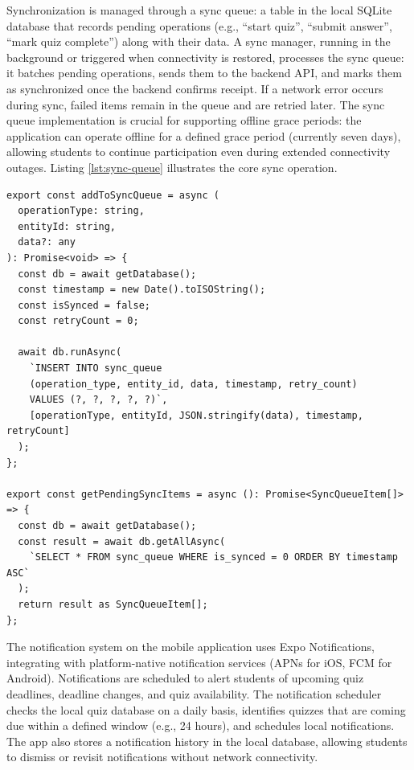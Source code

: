 \documentclass[a4paper,9pt,twocolumn]{extarticle}
\begin{document}
Synchronization is managed through a sync queue: a table in the local SQLite database that records pending operations (e.g., ``start quiz'', ``submit answer'', ``mark quiz complete'') along with their data. A sync manager, running in the background or triggered when connectivity is restored, processes the sync queue: it batches pending operations, sends them to the backend API, and marks them as synchronized once the backend confirms receipt. If a network error occurs during sync, failed items remain in the queue and are retried later. The sync queue implementation is crucial for supporting offline grace periods: the application can operate offline for a defined grace period (currently seven days), allowing students to continue participation even during extended connectivity outages. Listing \ref{lst:sync-queue} illustrates the core sync operation.

\begin{verbatim}
export const addToSyncQueue = async (
  operationType: string,
  entityId: string,
  data?: any
): Promise<void> => {
  const db = await getDatabase();
  const timestamp = new Date().toISOString();
  const isSynced = false;
  const retryCount = 0;
  
  await db.runAsync(
    `INSERT INTO sync_queue 
    (operation_type, entity_id, data, timestamp, retry_count) 
    VALUES (?, ?, ?, ?, ?)`,
    [operationType, entityId, JSON.stringify(data), timestamp, retryCount]
  );
};

export const getPendingSyncItems = async (): Promise<SyncQueueItem[]> => {
  const db = await getDatabase();
  const result = await db.getAllAsync(
    `SELECT * FROM sync_queue WHERE is_synced = 0 ORDER BY timestamp ASC`
  );
  return result as SyncQueueItem[];
};
\end{verbatim}
\label{lst:sync-queue}

The notification system on the mobile application uses Expo Notifications, integrating with platform-native notification services (APNs for iOS, FCM for Android). Notifications are scheduled to alert students of upcoming quiz deadlines, deadline changes, and quiz availability. The notification scheduler checks the local quiz database on a daily basis, identifies quizzes that are coming due within a defined window (e.g., 24 hours), and schedules local notifications. The app also stores a notification history in the local database, allowing students to dismiss or revisit notifications without network connectivity.
\end{document}
